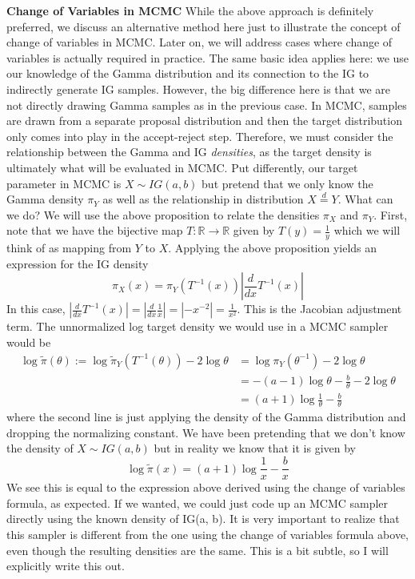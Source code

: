 \documentclass[12pt]{article}
\newcommand*{\abs}[1]{\left\lvert#1\right\rvert}
\newcommand{\R}{\mathcal{R}}
\def\R{\mathbb{R}}
\begin{document}
\bigskip
\noindent
\textbf{Change of Variables in MCMC}
While the above approach is definitely preferred, we discuss an alternative method here just to illustrate the concept of change of variables in MCMC. Later on, we will address 
cases where change of variables is actually required in practice. The same basic idea applies here: we use our knowledge of the Gamma distribution and its connection to the IG
 to indirectly generate IG samples. However, the big difference here is that we are not directly drawing Gamma samples as in the previous case. In MCMC, samples are drawn from a 
 separate proposal distribution and then the target distribution only comes into play in the accept-reject step. Therefore, we must consider the relationship between the Gamma and IG
 \textit{densities}, as the target density is ultimately what will be evaluated in MCMC. Put differently, our target parameter in MCMC is $X \sim IG(a, b)$ but pretend that we only know 
 the Gamma density $\pi_Y$ as well as the relationship in distribution $X \overset{d}{=} Y$. What can we do? We will use the above proposition to relate the densities $\pi_X$ and $\pi_Y$. 
 First, note that we have the bijective map $T: \R \to \R$ given by $T(y) = \frac{1}{y}$ which we will think of as mapping from $Y$ to $X$. Applying the above proposition yields an expression for 
 the IG density
 \[\pi_X(x) = \pi_Y(T^{-1}(x))\abs{\frac{d}{dx} T^{-1}(x)}\]
 In this case, $\abs{\frac{d}{dx} T^{-1}(x)} = \abs{\frac{d}{dx} \frac{1}{x}} = \abs{-x^{-2}} = \frac{1}{x^2}$. This is the Jacobian adjustment term. The unnormalized log target density we would use in a MCMC sampler
 would be 
\begin{align*}
\log \tilde{\pi}(\theta) := \log \tilde{\pi}_Y(T^{-1}(\theta)) - 2\log \theta &= \log \pi_Y(\theta^{-1}) - 2\log \theta \\
												       &= -(a - 1)\log \theta - \frac{b}{\theta} - 2\log \theta \\
												       &= (a + 1) \log \frac{1}{\theta} - \frac{b}{\theta}
\end{align*}
where the second line is just applying the density of the Gamma distribution and dropping the normalizing constant. We have been pretending that we don't know the density of $X \sim IG(a, b)$
but in reality we know that it is given by 
\[\log \tilde{\pi}(x) = (a + 1)\log \frac{1}{x} - \frac{b}{x}\]
We see this is equal to the expression above derived using the change of variables formula, as expected. If we wanted, we could just code up an MCMC sampler directly using the known 
density of IG(a, b). It is very important to realize that this sampler is different from the one using the change of variables formula above, even though the resulting densities are the same. This is a bit
subtle, so I will explicitly write this out. 
\end{document}
